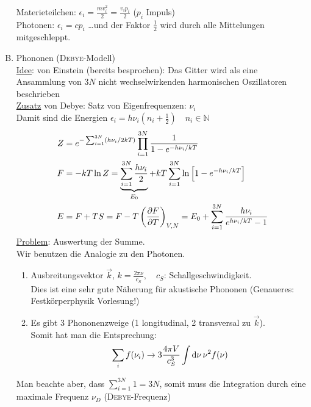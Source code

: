 \begin{enumerate}[A)]
    Materieteilchen: $\epsilon_i = \frac{m v_i^2}{2} = \frac{v_i p_i}{2}$ ($p_i$ Impuls)\\
    Photonen: $\epsilon_i = c p_i$ \ldots und der Faktor $\frac{1}{2}$ wird durch alle Mittelungen mitgeschleppt.
    \item Phononen (\textsc{Debye}-Modell) \\
    \underline{Idee}: von Einstein (bereits besprochen): Das Gitter wird als eine Ansammlung von $3N$ nicht wechselwirkenden  %
    harmonischen Oszillatoren beschrieben \\
    \underline{Zusatz} von Debye: Satz von Eigenfrequenzen: $\nu_i$ \\
    Damit sind die Energien $\epsilon_i = h \nu_i \left( n_i + \frac{1}{2} \right) \quad n_i \in \mathbb{N}$
    \begin{equation}
        \begin{split}
            Z &= e^{- \sum_{i=1}^{3N} \left( h \nu_i / 2 k T \right)} \prod_{i=1}^{3N} \frac{1}{1 - e^{- h \nu_i / k T}} \\
            F &= - k T \ln Z = \underbrace{\sum_{i=1}^{3N} \frac{h \nu_i}{2}}_{E_0} + k T \sum_{i=1}^{3N} \ln \left[ 1 - e^{- h \nu_i / k T} \right] \\
            E &= F + T S = F - T \left( \frac{\partial F}{\partial T} \right)_{V, N} = E_0 + \sum_{i=1}^{3N} \frac{h \nu_i}{e^{h \nu_i/kT} -1}
        \end{split}
    \end{equation}
    \underline{Problem}: Auswertung der Summe. \\
    Wir benutzen die Analogie zu den Photonen.
    \begin{enumerate}
        \item Ausbreitungsvektor $\vec{k}$, $k = \frac{2 \pi \nu}{c_S}, \quad c_S$: Schallgeschwindigkeit. \\
        Dies ist eine sehr gute Näherung für akustische Phononen (Genaueres: Festkörperphysik Vorlesung!)
        \item Es gibt 3 Phononenzweige (1 longitudinal, 2 transversal zu $\vec{k}$). \\
        Somit hat man die Entsprechung:
        \begin{equation}
            \sum_i f(\nu_i) \rightarrow 3 \frac{4 \pi V}{c_S^3} \int \mathrm{d} \nu \, \nu^2 f(\nu)
        \end{equation}
    \end{enumerate}
    Man beachte aber, dass $ \sum_{i=1}^{3N} 1 = 3 N$, somit muss die Integration durch eine maximale Frequenz $\nu_D$ (\textsc{Debye}-Frequenz)

\end{enumerate}
